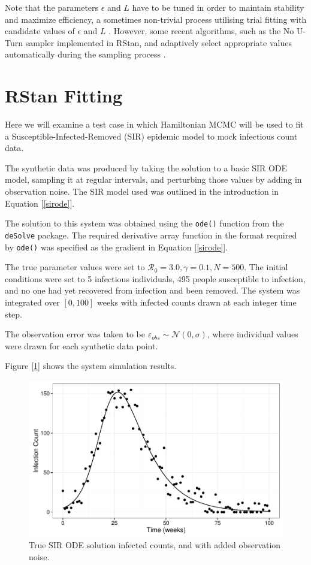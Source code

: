     Note that the parameters $\epsilon$ and $L$ have to be tuned in order to maintain stability and maximize efficiency, a sometimes non-trivial process utilising trial fitting with candidate values of $\epsilon$ and $L$ \cite{Neal2011}. However, some recent algorithms, such as the No U-Turn sampler implemented in RStan, and adaptively select appropriate values automatically during the sampling process \cite{Hoffman2014}.
    

\section{RStan Fitting}

    Here we will examine a test case in which Hamiltonian MCMC will be used to fit a Susceptible-Infected-Removed (SIR) epidemic model to mock infectious count data.

    The synthetic data was produced by taking the solution to a basic SIR ODE model, sampling it at regular intervals, and perturbing those values by adding in observation noise. The SIR model used was outlined in the introduction in Equation [\ref{sirode}].

    The solution to this system was obtained using the \verb|ode()| function from the \verb|deSolve| package. The required derivative array function in the format required by \verb|ode()| was specified as the gradient in Equation [\ref{sirode}].

    The true parameter values were set to $\mathcal{R}_0 = 3.0, \gamma = 0.1, N = 500$. The initial conditions were set to 5 infectious individuals, 495 people susceptible to infection, and no one had yet recovered from infection and been removed. The system was integrated over $[0,100]$ weeks with infected counts drawn at each integer time step.

    The observation error was taken to be $\varepsilon_{obs} \sim \mathcal{N}(0,\sigma)$, where individual values were drawn for each synthetic data point.

    Figure [\ref{mcmcdataplot}] shows the system simulation results.

    \begin{figure}
        \centering
        \includegraphics[width=\textwidth]{./images/dataplot.pdf}
        \caption{True SIR ODE solution infected counts, and with added observation noise. \label{mcmcdataplot}}
    \end{figure}


